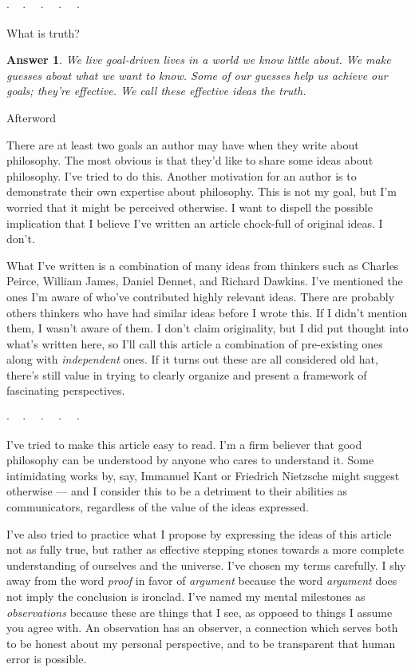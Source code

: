 \documentclass[11pt, oneside]{article}
\newtheorem*{answer}{Answer}
\newcommand{\dotq}{\cdot\quad}
\newcommand{\scenebreak}{
    \medskip\centerline{$\dotq\dotq\dotq\dotq\cdot$}\medskip
}
\begin{document}
\scenebreak

What is truth?
\begin{answer}{}
    We live goal-driven lives in a world we know little about.
    We make guesses about what we want to know.
    Some of our guesses help us achieve our goals; they're effective.
    We call these effective ideas the {\em truth}.
\end{answer}

\pagebreak

{\huge Afterword}
\bigskip

There are at least two goals an author may have when they write about
philosophy.
The most obvious is that they'd like to share some ideas about philosophy.
I've tried to do this.
Another motivation for an author is to demonstrate their own expertise about
philosophy.
This is not my goal, but I'm worried that it might be perceived otherwise.
I want to dispell the possible implication that I believe I've written an
article chock-full of original ideas. I don't.

What I've written is a combination of many ideas from thinkers such as Charles
Peirce, William James, Daniel Dennet, and Richard Dawkins.
I've mentioned the ones I'm aware of who've contributed highly relevant ideas.
There are probably others thinkers who have had similar ideas before I wrote
this. If I didn't mention them, I wasn't aware of them.
I don't claim
originality, but I did put thought into what's written here, so I'll call this
article a combination of pre-existing ones along with {\em independent} ones.
If it turns out these are all considered old hat, there's still value in
trying to clearly organize and present a framework of fascinating perspectives.

\scenebreak

I've tried to make this article easy to read.
I'm a firm believer that
good philosophy can be understood by anyone who cares to understand it.
Some intimidating works by, say, Immanuel Kant or Friedrich Nietzsche might
suggest otherwise ---
and I consider this to be a detriment to their abilities as
communicators, regardless of the value of the ideas expressed.

I've also tried to practice what I propose by expressing the ideas of this
article not as fully true,
but rather as effective stepping stones towards
a more complete understanding of ourselves and the universe. I've chosen my
terms carefully. I shy away from the word {\em proof} in favor of {\em argument}
because the word {\em argument} does not imply the conclusion is ironclad.
I've named my mental milestones as {\em observations} because these are things
that I see, as opposed to things I assume you agree with.
An observation has an observer,
a connection which serves both to be honest about my personal perspective,
and to be transparent that human error is possible.
\end{document}
